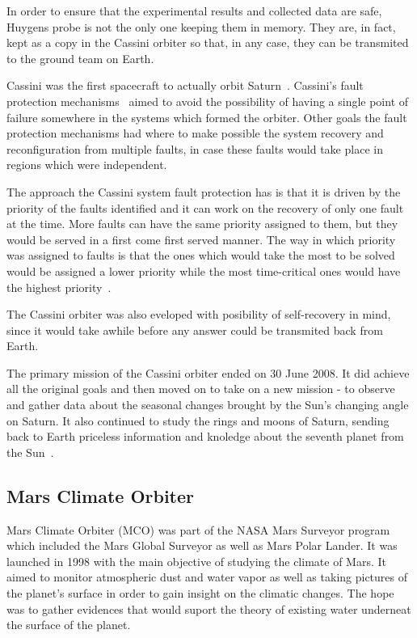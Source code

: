 In order to ensure that the experimental results and collected data are safe,
Huygens probe is not the only one keeping them in memory. They are, in fact,
kept as a copy in the Cassini orbiter so that, in any case, they can be
transmited to the ground team on Earth.

Cassini was the first spacecraft to actually orbit Saturn~\cite{ch-nasa}.
Cassini's fault protection mechanisms~\cite{cassini} aimed to avoid the
possibility of having a single point of failure somewhere in the systems which
formed the orbiter. Other goals the fault protection mechanisms had where to
make possible the system recovery and reconfiguration from multiple faults, in
case these faults would take place in regions which were independent.

The approach the Cassini system fault protection has is that it is driven by the
priority of the faults identified and it can work on the recovery of only one
fault at the time. More faults can have the same priority assigned to them, but
they would be served in a first come first served manner. The way in which
priority was assigned to faults is that the ones which would take the most to be
solved would be assigned a lower priority while the most time-critical ones
would have the highest priority~\cite{ft-space-avionics}.

The Cassini orbiter was also eveloped with posibility of self-recovery in mind,
since it would take awhile before any answer could be transmited back from
Earth.

The primary mission of the Cassini orbiter ended on 30 June 2008. It did achieve
all the original goals and then moved on to take on a new mission - to observe
and gather data about the seasonal changes brought by the Sun's changing angle
on Saturn. It also continued to study the rings and moons of Saturn, sending
back to Earth priceless information and knoledge about the seventh planet from
the Sun~\cite{ch-nasa}.

\subsection{Mars Climate Orbiter}
Mars Climate Orbiter (MCO)\cite{mco-nasa} was part of the NASA Mars Surveyor
program which included the Mars Global Surveyor as well as Mars Polar Lander. It
was launched in 1998 with the main objective of studying the climate of Mars. It
aimed to monitor atmospheric dust and water vapor as well as taking pictures of
the planet's surface in order to gain insight on the climatic changes. The hope
was to gather evidences that would suport the theory of existing water underneat
the surface of the planet.

